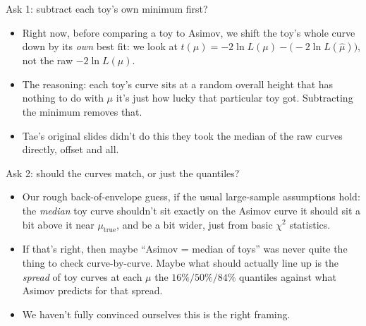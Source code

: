 \documentclass[aspectratio=169, 11pt]{beamer}
\newcommand{\mutrue}{\mu_{\mathrm{true}}}
\newcommand{\muhat}{\hat\mu}
\begin{document}
\begin{frame}{Ask 1: subtract each toy's own minimum first?}

  \begin{itemize}\small
    \item Right now, before comparing a toy to Asimov, we shift the toy's whole curve down by
      its \emph{own} best fit: we look at $t(\mu) = -2\ln L(\mu) - \big(-2\ln L(\muhat)\big)$,
      not the raw $-2\ln L(\mu)$.
    \item The reasoning: each toy's curve sits at a random overall height that has nothing to do
      with $\mu$ \textemdash{} it's just how lucky that particular toy got. Subtracting the
      minimum removes that.
    \item Tae's original slides didn't do this \textemdash{} they took the median of the raw
      curves directly, offset and all.
  \end{itemize}

\end{frame}

\begin{frame}{Ask 2: should the curves match, or just the quantiles?}

  \begin{itemize}\small
    \item Our rough back-of-envelope guess, if the usual large-sample assumptions hold: the
      \emph{median} toy curve shouldn't sit exactly on the Asimov curve \textemdash{} it should
      sit a bit above it near $\mutrue$, and be a bit wider, just from basic $\chi^2$ statistics.
    \item If that's right, then maybe ``Asimov = median of toys'' was never quite the thing to
      check curve-by-curve. Maybe what should actually line up is the \emph{spread} of toy
      curves at each $\mu$ \textemdash{} the $16\%/50\%/84\%$ quantiles \textemdash{} against
      what Asimov predicts for that spread.
    \item We haven't fully convinced ourselves this is the right framing.
  \end{itemize}

\end{frame}


\backupdivider
\end{document}
